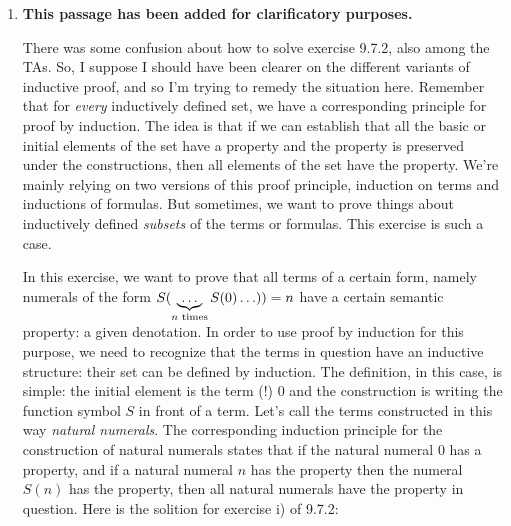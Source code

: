 \begin{enumerate}[\thesection.1]
              \item \textbf{This passage has been added for clarificatory purposes.}

                There was some confusion about how to solve exercise 9.7.2, also among the TAs. So, I suppose I should have been clearer on the different variants of inductive proof, and so I'm trying to remedy the situation here. Remember that for \emph{every} inductively defined set, we have a corresponding principle for proof by induction. The idea is that if we can establish that all the basic or initial elements of the set have a property and the property is preserved under the constructions, then all elements of the set have the property. We're mainly relying on two versions of this proof principle, induction on terms and inductions of formulas. But sometimes, we want to prove things about inductively defined \emph{subsets} of the terms or formulas. This exercise is such a case.

                In this exercise, we want to prove that all terms of a certain form, namely numerals of the form $S(\underbrace{\mathellipsis}_{n\text{ times}}S(0)\mathellipsis))=n$ have a certain semantic property: a given denotation. In order to use proof by induction for this purpose, we need to recognize that the terms in question have an inductive structure: their set can be defined by induction. The definition, in this case, is simple: the initial element is the term (!) 0 and the construction is writing the function symbol $S$ in front of a term. Let's call the terms constructed in this way \emph{natural numerals}. The corresponding induction principle for the construction of natural numerals states that if the natural numeral 0 has a property, and if a natural numeral $n$ has the property then the numeral $S(n)$ has the property, then all natural numerals have the property in question. Here is the solition for exercise i) of 9.7.2:


\end{enumerate}
